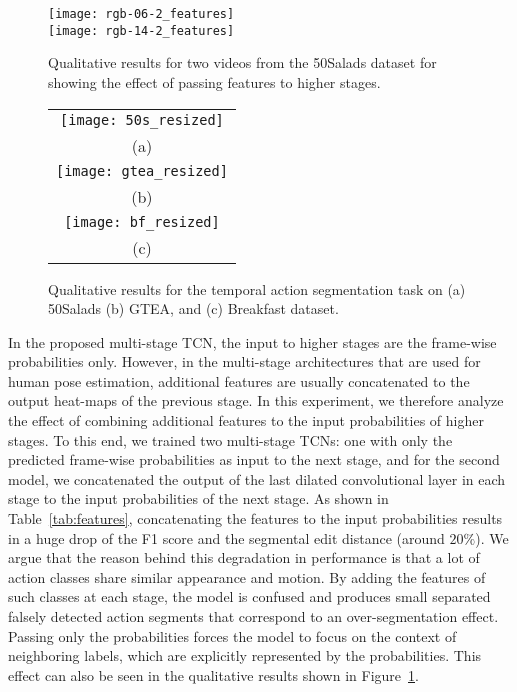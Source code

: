 \documentclass[10pt,twocolumn,letterpaper]{article}
\begin{document}
\begin{figure}[tb]
\begin{center}
   \texttt{[image: rgb-06-2\_features]}
   \\
   \texttt{[image: rgb-14-2\_features]}
\end{center}
   \caption{Qualitative results for two videos from the 50Salads dataset for showing the effect 
   of passing features to higher stages.}
\label{fig:features}
\end{figure}
\begin{figure*}[tb]
\begin{center}
\begin{tabular}{c}
   \texttt{[image: 50s\_resized]}
  	\\
  	(a) 
  	\\
  	\texttt{[image: gtea\_resized]}
  	\\
  	(b) 
  	\\
  	\texttt{[image: bf\_resized]}
  	\\
  	(c) 
\end{tabular}
\end{center}
   \caption{Qualitative results for the temporal action segmentation task on (a) 50Salads 
   (b) GTEA, and (c) Breakfast dataset.}
\label{fig:qualitative_res}
\end{figure*}
In the proposed multi-stage TCN, the input to higher stages are the 
frame-wise probabilities only. However, in the multi-stage architectures 
that are used for human pose estimation, additional features are 
usually concatenated to the output heat-maps of the previous stage.  
In this experiment, we therefore analyze the effect of combining additional 
features to the input probabilities of higher stages. To this end, we trained 
two multi-stage TCNs: one with only the predicted frame-wise probabilities 
as input to the next stage, and for the second model, we concatenated the output 
of the last dilated convolutional layer in each stage to the input probabilities 
of the next stage. As shown in Table~\ref{tab:features}, concatenating 
the features to the input probabilities results in a huge drop of the F1 score 
and the segmental edit distance (around $20\%$). We argue that the reason behind this 
degradation in performance is that a lot of action classes share similar appearance 
and motion. By adding the features of such classes at each stage, the model 
is confused and produces small separated falsely detected action segments 
that correspond to an over-segmentation effect. Passing only the probabilities 
forces the model to focus on the context of neighboring labels, which are explicitly 
represented by the probabilities. This effect can also be seen in the qualitative 
results shown in Figure~\ref{fig:features}.
\end{document}
